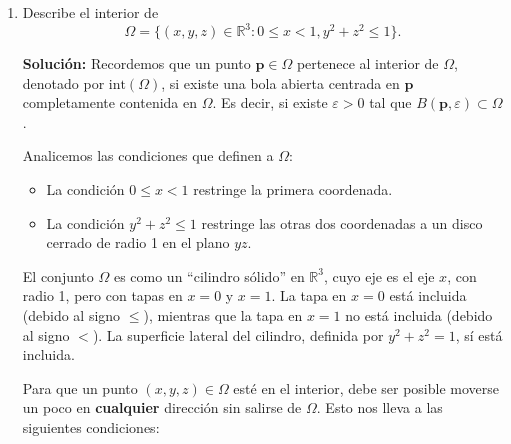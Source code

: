 \documentclass[12pt]{article}
\newcommand{\abs}[1]{\left\vert#1\right\vert}
\newcommand{\norm}[1]{\left\Vert#1\right\Vert}
\newcommand{\Int}{\mathrm{int}}
\newcommand{\R}{\mathbb R}
\newcommand{\x}{\mathrm x}
\begin{document}
\begin{enumerate}
\begin{enumerate}[(1)]
\textbf{Segunda desigualdad:} $\norm{\x}\leq \norm{\x}_1$.

Demostraremos esta desigualdad elevando al cuadrado ambos lados. Como ambas cantidades son no negativas, es suficiente demostrar que $\norm{\x}^2 \leq \norm{\x}_1^2$. Tenemos:
\[
\norm{\x}^2 = \sum_{i=1}^{n} x_i^2.
\]
Por otro lado,
\[
\norm{\x}_1^2 = \left(\sum_{i=1}^{n} \abs{x_i}\right)^2 = \sum_{i=1}^{n} \abs{x_i}^2 + 2\sum_{1 \leq i < j \leq n} \abs{x_i}\abs{x_j}.
\]
Observamos que $\sum_{i=1}^{n} \abs{x_i}^2 = \sum_{i=1}^{n} x_i^2 = \norm{\x}^2$ y que el término $2\sum_{1 \leq i < j \leq n} \abs{x_i}\abs{x_j}$ es no negativo (es una suma de productos de valores absolutos, todos $\geq 0$). Por lo tanto,
\[
\norm{\x}_1^2 = \norm{\x}^2 + 2\sum_{1 \leq i < j \leq n} \abs{x_i}\abs{x_j} \geq \norm{\x}^2.
\]
Tomando raíz cuadrada en ambos lados, concluimos que
\[
\norm{\x} \leq \norm{\x}_1.
\]
Por lo tanto, combinando ambas desigualdades, se cumple
\[
\frac{1}{\sqrt{n}}\norm{\x}_1\leq \norm{\x}\leq \norm{\x}_1.
\]
\end{enumerate}

\item Describe el interior de
\[ \Omega = \{ (x,y,z)\in \R^3 : 0\leq x < 1, y^2+z^2\leq 1\}. \]

\textbf{Solución: } Recordemos que un punto $\mathbf{p} \in \Omega$ pertenece al interior de $\Omega$, denotado por $\Int(\Omega)$, si existe una bola abierta centrada en $\mathbf{p}$ completamente contenida en $\Omega$. Es decir, si existe $\varepsilon > 0$ tal que $B(\mathbf{p}, \varepsilon) \subset \Omega$.

Analicemos las condiciones que definen a $\Omega$:
\begin{itemize}
    \item La condición $0 \leq x < 1$ restringe la primera coordenada.
    \item La condición $y^2 + z^2 \leq 1$ restringe las otras dos coordenadas a un disco cerrado de radio 1 en el plano $yz$.
\end{itemize}

El conjunto $\Omega$ es como un ``cilindro sólido'' en $\R^3$, cuyo eje es el eje $x$, con radio 1, pero con tapas en $x=0$ y $x=1$. La tapa en $x=0$ está incluida (debido al signo $\leq$), mientras que la tapa en $x=1$ no está incluida (debido al signo $<$). La superficie lateral del cilindro, definida por $y^2+z^2 = 1$, sí está incluida.

Para que un punto $(x,y,z) \in \Omega$ esté en el interior, debe ser posible moverse un poco en \textbf{cualquier} dirección sin salirse de $\Omega$. Esto nos lleva a las siguientes condiciones:


\end{enumerate}
\end{document}
